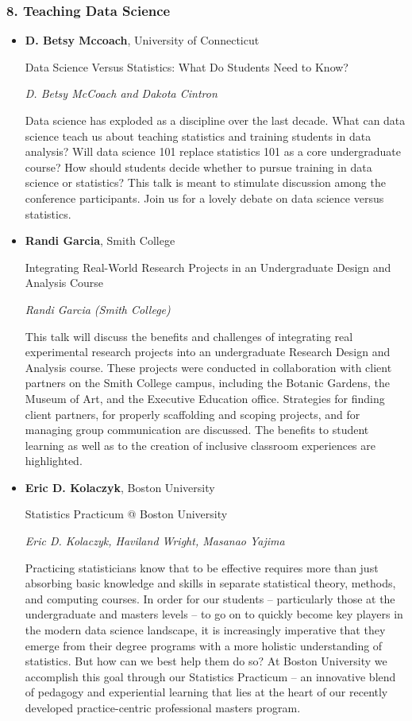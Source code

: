 \subsubsection*{8. Teaching Data Science}

\begin{itemize}
\item \textbf{D. Betsy Mccoach}, University of Connecticut

Data Science Versus Statistics: What Do Students Need to Know?

\emph{\footnotesize D. Betsy McCoach and Dakota Cintron}

Data science has exploded as a discipline over the last decade. What can data science teach us about teaching statistics and training students in data analysis? Will data science 101 replace statistics 101 as a core undergraduate course? How should students decide whether to pursue training in data science or statistics? This talk is meant to stimulate discussion among the conference participants. Join us for a lovely debate on data science versus statistics.

\item \textbf{Randi Garcia}, Smith College

Integrating Real-World Research Projects in an Undergraduate Design and Analysis Course

\emph{\footnotesize Randi Garcia (Smith College)}

This talk will discuss the benefits and challenges of integrating real experimental research projects into an undergraduate Research Design and Analysis course. These projects were conducted in collaboration with client partners on the Smith College campus, including the Botanic Gardens, the Museum of Art, and the Executive Education office. Strategies for finding client partners, for properly scaffolding and scoping projects, and for managing group communication are discussed. The benefits to student learning as well as to the creation of inclusive classroom experiences are highlighted.

\item \textbf{Eric D. Kolaczyk}, Boston University

Statistics Practicum @ Boston University

\emph{\footnotesize Eric D. Kolaczyk, Haviland Wright, Masanao Yajima}

Practicing statisticians know that to be effective requires more than just absorbing basic knowledge and skills in separate statistical theory, methods, and computing courses.  In order for our students -- particularly those at the undergraduate and masters levels -- to go on to quickly become key players in the modern data science landscape, it is increasingly imperative that they emerge from their degree programs with a more holistic understanding of statistics.  But how can we best help them do so?  At Boston University we accomplish this goal through our Statistics Practicum -- an innovative blend of pedagogy and experiential learning that lies at the heart of our recently developed practice-centric professional masters program.

\end{itemize}

